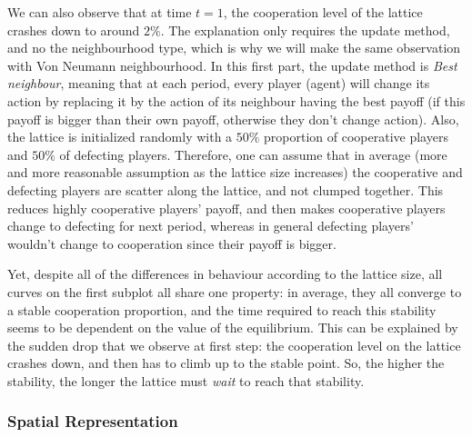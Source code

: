 \documentclass{article}
\begin{document}
We can also observe that at time $t=1$, the cooperation level of the lattice crashes down to around
$2\%$. The explanation only requires the update method, and no the neighbourhood type, which is why
we will make the same observation with Von Neumann neighbourhood. In this first part, the update
method is \textit{Best neighbour}, meaning that at each period, every player (agent) will change its
action by replacing it by the action of its neighbour having the best payoff (if this payoff is
bigger than their own payoff, otherwise they don't change action). Also, the lattice is initialized
randomly with a $50\%$ proportion of cooperative players and $50\%$ of defecting players. Therefore,
one can assume that in average (more and more reasonable assumption as the lattice size increases)
the cooperative and defecting players are scatter along the lattice, and not clumped together. This
reduces highly cooperative players' payoff, and then makes cooperative players change to defecting
for next period, whereas in general defecting players' wouldn't change to cooperation since their
payoff is bigger.

Yet, despite all of the differences in behaviour according to the lattice size, all curves on the first
subplot all share one property: in average, they all converge to a stable cooperation proportion, and
the time required to reach this stability seems to be dependent on the value of the equilibrium.
This can be explained by the sudden drop that we observe at first step: the cooperation level on the
lattice crashes down, and then has to climb up to the stable point. So, the higher the stability, the
longer the lattice must \textit{wait} to reach that stability.

\subsubsection{Spatial Representation}
\end{document}
